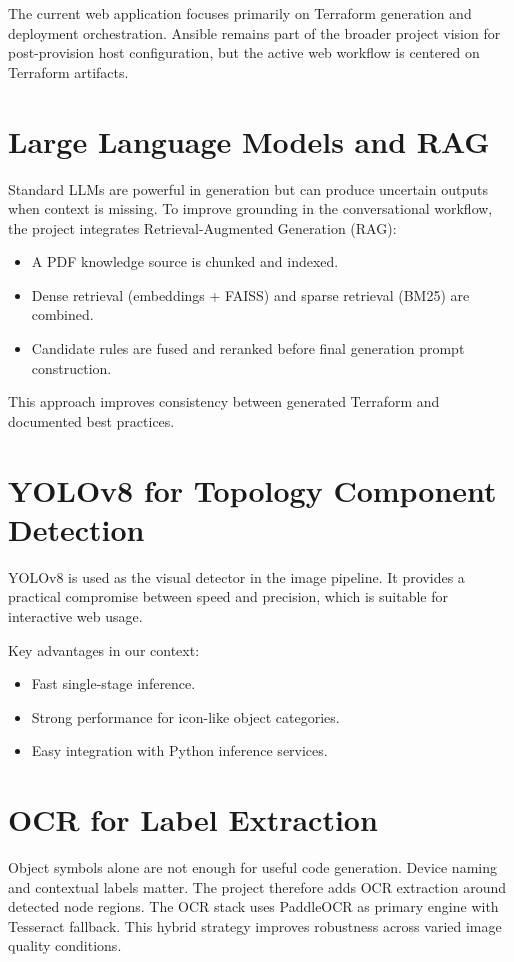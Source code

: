 \documentclass[12pt,a4paper,openany]{report}
\begin{document}
The current web application focuses primarily on Terraform generation and deployment orchestration. Ansible remains part of the broader project vision for post-provision host configuration, but the active web workflow is centered on Terraform artifacts.

\section{Large Language Models and RAG}

Standard LLMs are powerful in generation but can produce uncertain outputs when context is missing. To improve grounding in the conversational workflow, the project integrates Retrieval-Augmented Generation (RAG):
\begin{itemize}
    \item A PDF knowledge source is chunked and indexed.
    \item Dense retrieval (embeddings + FAISS) and sparse retrieval (BM25) are combined.
    \item Candidate rules are fused and reranked before final generation prompt construction.
\end{itemize}

This approach improves consistency between generated Terraform and documented best practices.

\section{YOLOv8 for Topology Component Detection}

YOLOv8 is used as the visual detector in the image pipeline. It provides a practical compromise between speed and precision, which is suitable for interactive web usage.

Key advantages in our context:
\begin{itemize}
    \item Fast single-stage inference.
    \item Strong performance for icon-like object categories.
    \item Easy integration with Python inference services.
\end{itemize}

\section{OCR for Label Extraction}

Object symbols alone are not enough for useful code generation. Device naming and contextual labels matter. The project therefore adds OCR extraction around detected node regions. The OCR stack uses PaddleOCR as primary engine with Tesseract fallback. This hybrid strategy improves robustness across varied image quality conditions.
\end{document}
